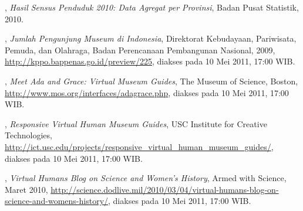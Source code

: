 \begin{thebibliography}{10}
\underline{\hspace{5em}}, {\em Hasil Sensus Penduduk 2010: Data Agregat per Provinsi\/},
  {Badan Pusat Statistik}, 2010.

\underline{\hspace{5em}}, {\em Jumlah Pengunjung Museum di Indonesia\/},
  {Direktorat Kebudayaan, Pariwisata, Pemuda, dan Olahraga, Badan Perencanaan Pembangunan Nasional}, 2009,
  \urlprefix\url{http://kppo.bappenas.go.id/preview/225}, diakses pada 10 Mei 2011, 17:00 WIB.
  
\underline{\hspace{5em}}, {\em Meet Ada and Grace: Virtual Museum Guides\/},
  {The Museum of Science, Boston}, \urlprefix\url{http://www.mos.org/interfaces/adagrace.php},
  diakses pada 10 Mei 2011, 17:00 WIB.

\underline{\hspace{5em}}, {\em Responsive Virtual Human Museum Guides\/},
  {USC Institute for Creative Technologies},
  \urlprefix\url{http://ict.usc.edu/projects/responsive_virtual_human_museum_guides/},
  diakses pada 10 Mei 2011, 17:00 WIB.

\underline{\hspace{5em}}, {\em Virtual Humans Blog on Science and Women’s History\/},
  {Armed with Science}, Maret 2010,
  \urlprefix\url{http://science.dodlive.mil/2010/03/04/virtual-humans-blog-on-science-and-womens-history/},
  diakses pada 10 Mei 2011, 17:00 WIB.

\end{thebibliography}
